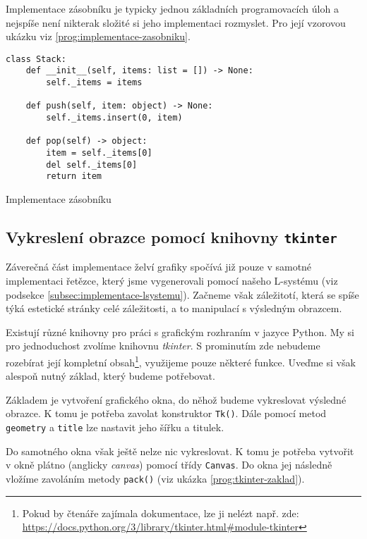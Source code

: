 Implementace zásobníku je typicky jednou základních programovacích úloh a nejspíše není nikterak složité si jeho implementaci rozmyslet. Pro její vzorovou ukázku viz \ref{prog:implementace-zasobniku}.
\begin{program}[h]
\begin{lstlisting}[style=python]
class Stack:
    def __init__(self, items: list = []) -> None:
        self._items = items

    def push(self, item: object) -> None:
        self._items.insert(0, item)
    
    def pop(self) -> object:
        item = self._items[0]
        del self._items[0]
        return item  
\end{lstlisting}
    \caption{Implementace zásobníku}
    \label{prog:implementace-zasobniku}
\end{program}

\subsection{Vykreslení obrazce pomocí knihovny \texttt{tkinter}}\label{subsec:vykresleni-obrazce}

Záverečná část implementace želví grafiky spočívá již pouze v samotné implementaci řetězce, který jsme vygenerovali pomocí našeho L-systému (viz podsekce \ref{subsec:implementace-lsystemu}). Začneme však záležitotí, která se spíše týká estetické stránky celé záležitosti, a to manipulací s výsledným obrazcem.

Existují různé knihovny pro práci s grafickým rozhraním v jazyce Python. My si pro jednoduchost zvolíme knihovnu \emph{tkinter}. S prominutím zde nebudeme rozebírat její kompletní obsah\footnote{Pokud by čtenáře zajímala dokumentace, lze ji nelézt např. zde: \url{https://docs.python.org/3/library/tkinter.html\#module-tkinter}}, využijeme pouze některé funkce. Uveďme si však alespoň nutný základ, který budeme potřebovat.

Základem je vytvoření grafického okna, do něhož budeme vykreslovat výsledné obrazce. K tomu je potřeba zavolat konstruktor \texttt{Tk()}. Dále pomocí metod \texttt{geometry} a \texttt{title} lze nastavit jeho šířku a titulek.

Do samotného okna však ještě nelze nic vykreslovat. K tomu je potřeba vytvořit v okně plátno (anglicky \emph{canvas}) pomocí třídy \texttt{Canvas}. Do okna jej následně vložíme zavoláním metody \texttt{pack()} (viz ukázka \ref{prog:tkinter-zaklad}).

